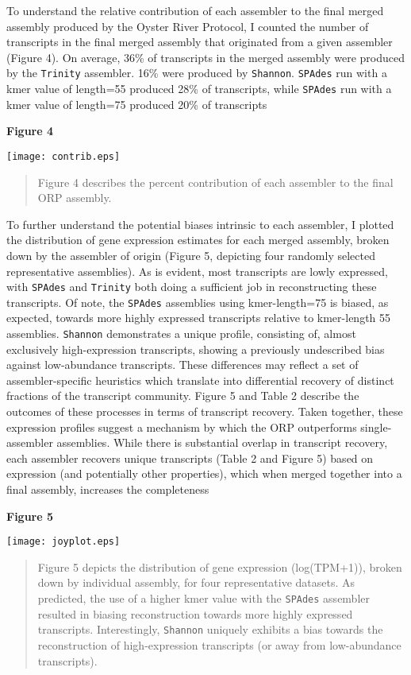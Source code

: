 \documentclass[10pt,letterpaper]{article}
\begin{document}
To understand the relative contribution of each assembler to the final merged assembly produced by the Oyster River Protocol, I counted the number of transcripts in the final merged assembly that originated from a given assembler (Figure 4). On average, 36\% of transcripts in the merged assembly were produced by the \texttt{Trinity} assembler. 16\% were produced by \texttt{Shannon}. \texttt{SPAdes} run with a kmer value of length=55 produced 28\% of transcripts, while \texttt{SPAdes} run with a kmer value of length=75 produced 20\% of transcripts 

\newpage
\textbf{\hypertarget{Figure 4}{Figure 4}} \\
\centerline{\texttt{[image: contrib.eps]}}
\begin{quote}
\small{Figure 4 describes the percent contribution of each assembler to the final ORP assembly.}
\end{quote} 


To further understand the potential biases intrinsic to each assembler, I plotted the distribution of gene expression estimates for each merged assembly, broken down by the assembler of origin (Figure 5, depicting four randomly selected representative assemblies). As is evident, most transcripts are lowly expressed, with \texttt{SPAdes} and \texttt{Trinity} both doing a sufficient job in reconstructing these transcripts. Of note, the \texttt{SPAdes} assemblies using kmer-length=75 is biased, as expected, towards more highly expressed transcripts relative to kmer-length 55 assemblies. \texttt{Shannon} demonstrates a unique profile, consisting of, almost exclusively high-expression transcripts, showing a previously undescribed bias against low-abundance transcripts. These differences may reflect a set of assembler-specific heuristics which translate into differential recovery of distinct fractions of the transcript community. Figure 5 and Table 2 describe the outcomes of these processes in terms of transcript recovery. Taken together, these expression profiles suggest a mechanism by which the ORP outperforms single-assembler assemblies. While there is substantial overlap in transcript recovery, each assembler recovers unique transcripts (Table 2 and Figure 5) based on expression (and potentially other properties), which when merged together into a final assembly, increases the completeness 

 

\textbf{\hypertarget{Figure 5}{Figure 5}} \\
\centerline{\texttt{[image: joyplot.eps]}}
\begin{quote}
\small{Figure 5 depicts the distribution of gene expression (log(TPM+1)), broken down by individual assembly, for four representative datasets. As predicted, the use of a higher kmer value with the \texttt{SPAdes} assembler resulted in biasing reconstruction towards more highly expressed transcripts. Interestingly, \texttt{Shannon} uniquely exhibits a bias towards the reconstruction of high-expression transcripts (or away from low-abundance transcripts).}
\end{quote} 
\end{document}
